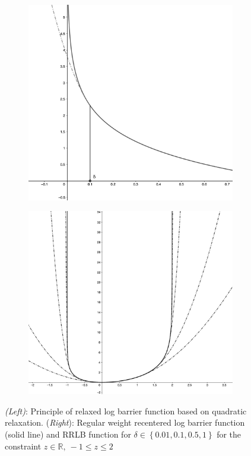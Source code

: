 \documentclass[conference]{IEEEtran}
\theoremstyle{definition}
\theoremstyle{remark}
\newcommand{\R}{\mathbb{R}}
\begin{document}
\begin{figure}
	\centering
	\begin{subfigure}{0.5\linewidth}
		\centering
		\includegraphics[width=0.9\linewidth]{images/quad-extension.png}
	\end{subfigure}%
	\begin{subfigure}{0.5\linewidth}
		\centering
		\includegraphics[width=0.9\linewidth]{images/rrlb-functions.png}
	\end{subfigure}
	\caption{\textit{(Left)}: Principle of relaxed log barrier function based on quadratic relaxation. (\textit{Right}): Regular weight recentered log barrier function (solid line) and RRLB function for $\delta\in\left\{ 0.01,0.1,0.5,1 \right\}$ for the constraint $z\in\R,~-1\leq z\leq 2$}
	\label{fig:RRLB-functions}
\end{figure}
\end{document}
